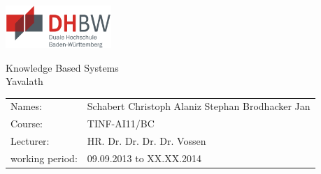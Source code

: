\documentclass[german]{report}
\begin{document}
\pagestyle{fancy}

\rfoot{\thepage}
\fancyhfoffset{\marginparsep}
\renewcommand{\footrulewidth}{1.0pt}
\renewcommand{\headrulewidth}{1.0pt}
\renewcommand{\headheight}{30pt}





\begin{titlepage}

\begin{flushright}
    \includegraphics*[width=4.0cm]{abbildungen/dhbwlogo} \\ 
\end{flushright}
\begin{center}
\vspace{1.5cm}
\Huge{ \textsf{Knowledge Based Systems}} \\
	Yavalath\\
    \vspace{4cm}
 \normalsize{
    \begin{tabular}{ll}
    	Names: & {Schabert Christoph  Alaniz Stephan  Brodhacker Jan} \\
    	Course: & {TINF-AI11/BC}	\\
    	Lecturer: &  HR. Dr. Dr. Dr. Dr. Vossen\\
    	working period: & 09.09.2013 to XX.XX.2014
    \end{tabular}\\
    }
\end{center}

\end{titlepage}

\newpage
\end{document}
